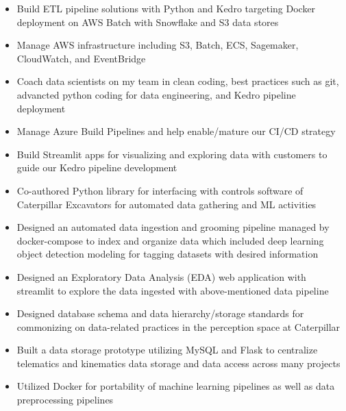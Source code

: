 \documentclass[10pt,a4paper,ragged2e,withhyper]{altacv}
\begin{document}
\begin{paracol}{2}



\begin{itemize}

\item Build ETL pipeline solutions with Python and Kedro targeting Docker deployment on AWS Batch with Snowflake and S3 data stores
\item Manage AWS infrastructure including S3, Batch, ECS, Sagemaker, CloudWatch, and EventBridge 
\item Coach data scientists on my team in clean coding, best practices such as git, advancted python coding for data engineering, and Kedro pipeline deployment 
\item Manage Azure Build Pipelines and help enable/mature our CI/CD strategy
\item Build Streamlit apps for visualizing and exploring data with customers to guide our Kedro pipeline development 

\end{itemize}

\divider

\begin{itemize}
\item  Co-authored Python library for interfacing with controls software of Caterpillar Excavators for automated data gathering and ML activities
\item  Designed an automated data ingestion and grooming pipeline managed by docker-compose to index and organize data which included deep learning object detection modeling for tagging datasets with desired information
\item  Designed an Exploratory Data Analysis (EDA) web application with streamlit to explore the data ingested with above-mentioned data pipeline
\item  Designed database schema and data hierarchy/storage standards for commonizing on data-related practices in the perception space at Caterpillar
\item  Built a data storage prototype utilizing MySQL and Flask to centralize telematics and kinematics data storage and data access across many projects
\item  Utilized Docker for portability of machine learning pipelines as well as data preprocessing pipelines
\end{itemize}


\end{paracol}
\end{document}
